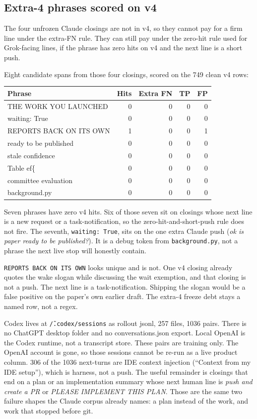 \subsection{Extra-4 phrases scored on v4}
\label{sec:extra4score}

The four unfrozen Claude closings are not in v4, so they cannot
pay for a firm line under the extra-FN rule. They can still pay
under the zero-hit rule used for Grok-facing lines, if the phrase
has zero hits on v4 and the next line is a short push.

Eight candidate spans from those four closings, scored on the 749
clean v4 rows:

\begin{center}
{\small\begin{tabular}{lrrrr}
\toprule
Phrase & Hits & Extra FN & TP & FP \\
\midrule
THE WORK YOU LAUNCHED & 0 & 0 & 0 & 0 \\
waiting: True & 0 & 0 & 0 & 0 \\
REPORTS BACK ON ITS OWN & 1 & 0 & 0 & 1 \\
ready to be published & 0 & 0 & 0 & 0 \\
stale confidence & 0 & 0 & 0 & 0 \\
Table ef\{ & 0 & 0 & 0 & 0 \\
committee evaluation & 0 & 0 & 0 & 0 \\
background.py & 0 & 0 & 0 & 0 \\
\bottomrule
\end{tabular}}
\end{center}

Seven phrases have zero v4 hits. Six of those seven sit on closings
whose next line is a new request or a task-notification, so the
zero-hit-and-short-push rule does not fire. The seventh,
\texttt{waiting: True}, sits on the one extra Claude push
(\emph{ok is paper ready to be published?}). It is a debug token
from \texttt{background.py}, not a phrase the next live stop will
honestly contain.

\texttt{REPORTS BACK ON ITS OWN} looks unique and is not. One v4
closing already quotes the wake slogan while discussing the wait
exemption, and that closing is not a push. The next line is a
task-notification. Shipping the slogan would be a false positive
on the paper's own earlier draft. The extra-4 freeze debt stays a
named row, not a regex.



Codex lives at \texttt{\~/.codex/sessions} as rollout jsonl, 257
files, 1036 pairs. There is no ChatGPT desktop folder and no
conversations.json export. Local OpenAI is the Codex runtime, not a
transcript store. These pairs are training only. The OpenAI account
is gone, so those sessions cannot be re-run as a live product
column. 306 of the 1036 next-turns are IDE context injection
(``Context from my IDE setup''), which is harness, not a push. The
useful remainder is closings that end on a plan or an implementation
summary whose next human line is \emph{push and create a PR} or
\emph{PLEASE IMPLEMENT THIS PLAN}. Those are the same two failure
shapes the Claude corpus already names: a plan instead of the work,
and work that stopped before git.


